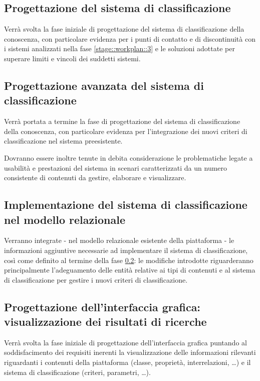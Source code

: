 \documentclass[10pt,a4paper,hidelinks]{scrartcl} %
\begin{document}
	\subsection{Progettazione del sistema di classificazione}
	\label{stage::workplan::4}
	Verrà svolta la fase iniziale di progettazione del sistema di classificazione della conoscenza, con particolare evidenza per i punti di contatto e di discontinuità con i sistemi analizzati nella fase \ref{stage::workplan::3} e le soluzioni adottate per superare limiti e vincoli dei suddetti sistemi.

	\subsection{Progettazione avanzata del sistema di classificazione}
	\label{stage::workplan::5}
	Verrà portata a termine la fase di progettazione del sistema di classificazione della conoscenza, con particolare evidenza per l'integrazione dei nuovi criteri di classificazione nel sistema preesistente.

	Dovranno essere inoltre tenute in debita considerazione le problematiche legate a usabilità e prestazioni del sistema in scenari caratterizzati da un numero consistente di contenuti da gestire, elaborare e visualizzare.
	
	\subsection{Implementazione del sistema di classificazione nel modello relazionale}
	\label{stage::workplan::6}
	Verranno integrate - nel modello relazionale esistente della piattaforma - le informazioni aggiuntive necessarie ad implementare il sistema di classificazione, così come definito al termine della fase \ref{stage::workplan::5}: le modifiche introdotte riguarderanno principalmente l'adeguamento delle entità relative ai tipi di contenuti e al sistema di classificazione per gestire i nuovi criteri di classificazione.

	\subsection{Progettazione dell'interfaccia grafica: visualizzazione dei risultati di ricerche}
	\label{stage::workplan::7}
	Verrà svolta la fase iniziale di progettazione dell'interfaccia grafica puntando al soddisfacimento dei requisiti inerenti la visualizzazione delle informazioni rilevanti riguardanti i contenuti della piattaforma (classe, proprietà, interrelazioni, \ldots) e il sistema di classificazione (criteri, parametri, \ldots).
\end{document}
